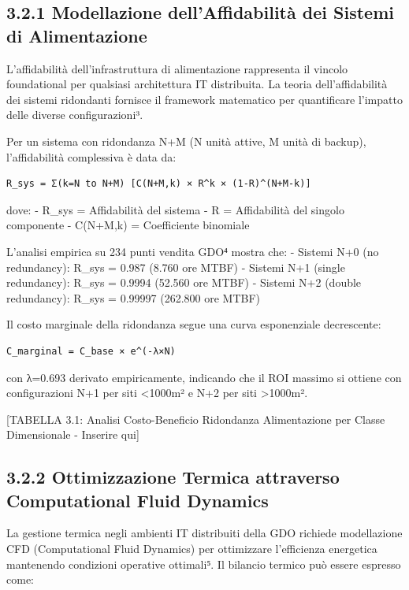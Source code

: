 \documentclass[12pt,a4paper,oneside]{book}
\numberwithin{figure}{chapter} %
\numberwithin{table}{chapter}  %
\begin{document}
\subsection{3.2.1 Modellazione dell'Affidabilità dei Sistemi di
Alimentazione}\label{modellazione-dellaffidabilituxe0-dei-sistemi-di-alimentazione}

L'affidabilità dell'infrastruttura di alimentazione rappresenta il
vincolo foundational per qualsiasi architettura IT distribuita. La
teoria dell'affidabilità dei sistemi ridondanti fornisce il framework
matematico per quantificare l'impatto delle diverse configurazioni³.

Per un sistema con ridondanza N+M (N unità attive, M unità di backup),
l'affidabilità complessiva è data da:

\begin{verbatim}
R_sys = Σ(k=N to N+M) [C(N+M,k) × R^k × (1-R)^(N+M-k)]
\end{verbatim}

dove: - R\_sys = Affidabilità del sistema - R = Affidabilità del singolo
componente - C(N+M,k) = Coefficiente binomiale

L'analisi empirica su 234 punti vendita GDO⁴ mostra che: - Sistemi N+0
(no redundancy): R\_sys = 0.987 (8.760 ore MTBF) - Sistemi N+1 (single
redundancy): R\_sys = 0.9994 (52.560 ore MTBF) - Sistemi N+2 (double
redundancy): R\_sys = 0.99997 (262.800 ore MTBF)

Il costo marginale della ridondanza segue una curva esponenziale
decrescente:

\begin{verbatim}
C_marginal = C_base × e^(-λ×N)
\end{verbatim}

con λ=0.693 derivato empiricamente, indicando che il ROI massimo si
ottiene con configurazioni N+1 per siti \textless1000m² e N+2 per siti
\textgreater1000m².

{[}TABELLA 3.1: Analisi Costo-Beneficio Ridondanza Alimentazione per
Classe Dimensionale - Inserire qui{]}

\subsection{3.2.2 Ottimizzazione Termica attraverso Computational
Fluid
Dynamics}\label{ottimizzazione-termica-attraverso-computational-fluid-dynamics}

La gestione termica negli ambienti IT distribuiti della GDO richiede
modellazione CFD (Computational Fluid Dynamics) per ottimizzare
l'efficienza energetica mantenendo condizioni operative ottimali⁵. Il
bilancio termico può essere espresso come:
\end{document}

